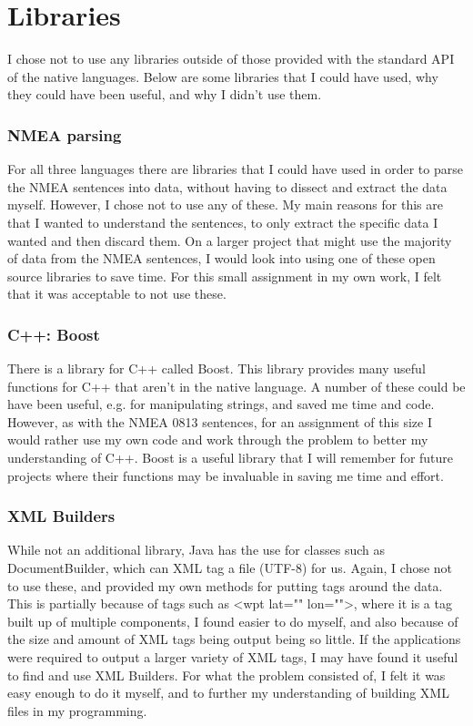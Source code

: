 \documentclass{article}
\begin{document}
\section{Libraries}

I chose not to use any libraries outside of those provided with the standard API of the native languages. Below are some libraries that I could have used, why they could have been useful, and why I didn't use them.

\subsubsection{NMEA parsing}
For all three languages there are libraries\cite{nmeajava}\cite{nmeacplusplus} that I could have used in order to parse the NMEA sentences into data, without having to dissect and extract the data myself. However, I chose not to use any of these. My main reasons for this are that I wanted to understand the sentences, to only extract the specific data I wanted and then discard them. On a larger project that might use the majority of data from the NMEA sentences, I would look into using one of these open source libraries to save time. For this small assignment in my own work, I felt that it was acceptable to not use these.

\subsubsection{C++: Boost}
There is a library for C++ called Boost\cite{boost}. This library provides many useful functions for C++ that aren't in the native language. A number of these could be have been useful, e.g. for manipulating strings, and saved me time and code. However, as with the NMEA 0813 sentences, for an assignment of this size I would rather use my own code and work through the problem to better my understanding of C++. Boost is a useful library that I will remember for future projects where their functions may be invaluable in saving me time and effort.

\subsubsection{XML Builders}
While not an additional library, Java has the use for classes such as DocumentBuilder\cite{javaxml}\cite{documentbuilder}, which can XML tag a file (UTF-8) for us. Again, I chose not to use these, and provided my own methods for putting tags around the data. This is partially because of tags such as \textless wpt lat="" lon=""\textgreater , where it is a tag built up of multiple components, I found easier to do myself, and also because of the size and amount of XML tags being output being so little. If the applications were required to output a larger variety of XML tags, I may have found it useful to find and use XML Builders. For what the problem consisted of, I felt it was easy enough to do it myself, and to further my understanding of building XML files in my programming.
\end{document}
